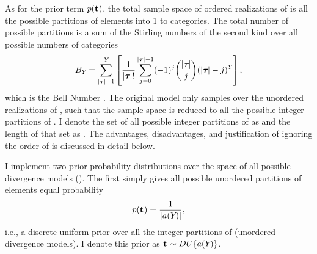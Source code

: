 \begin{linenomath}
As for the prior term $p(\mathbf{t_{}})$, the total sample space of
ordered realizations of \divTimeIndexVector is all the possible partitions of
\npairs{} elements into 1 to \npairs{} categories.
The total number of possible partitions is a sum of the Stirling numbers of
the second kind over all possible numbers of categories \divTimeNum
\begin{equation}
    B_{Y_{}}=\sum_{\lvert \boldsymbol{\tau_{}} \rvert=1}^{Y_{}} \left[
    \frac{1}{\lvert \boldsymbol{\tau_{}} \rvert!} \sum_{j=0}^{\lvert \boldsymbol{\tau_{}} \rvert-1} (-1)^{j}
    \binom{\lvert \boldsymbol{\tau_{}} \rvert}{j} (\lvert \boldsymbol{\tau_{}} \rvert-j)^{Y_{}} \right],
    \label{eq:bell}
\end{equation}
which is the Bell Number \cite{Bell1934}.
The original \msb model only samples over the unordered realizations of
\divTimeIndexVector, such that the sample space is reduced to all the possible
integer partitions of \npairs{} \cite{Oaks2012,Huang2011,OeisPartitionNumber,
    OeisPartitionTriangle,Malenfant2011}.
I denote the set of all possible integer partitions of \npairs{} as
\integerPartitionSet{\npairs{}} and the length of that set as
\integerPartitionNum{\npairs{}}.
The advantages, disadvantages, and justification of ignoring the order
of \divTimeIndexVector is discussed in detail below.
\end{linenomath}

\begin{linenomath}
I implement two prior probability distributions over the space
of all possible divergence models (\divTimeIndexVector).
The first simply gives all possible unordered partitions of \npairs{} elements
equal probability
\begin{equation}
    p(\mathbf{t_{}}) = \frac{1}{\lvert a({Y_{}}) \rvert},
    \label{eq:divModelPriorUniform}
\end{equation}
i.e., a discrete uniform prior over all the integer partitions of \npairs{}
(unordered divergence models).
I denote this prior as
$\mathbf{t_{}} \sim DU\{a({Y_{}})\}$.
\end{linenomath}


